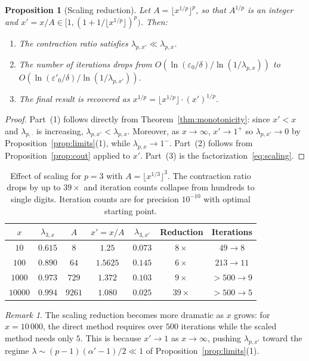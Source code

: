 \documentclass[10pt,a4paper,oneside]{book}
\newtheorem{proposition}[theorem]{Proposition}
\theoremstyle{definition}
\theoremstyle{remark}
\newtheorem{remark}[theorem]{Remark}
\newcommand{\eps}{\varepsilon}
\begin{document}
\begin{proposition}[Scaling reduction]
\label{prop:scaling}
Let $A = \lfloor x^{1/p} \rfloor^p$, so that $A^{1/p}$ is an integer and $x' = x/A \in [1, (1+1/\lfloor x^{1/p}\rfloor)^p)$. Then:
\begin{enumerate}
  \item The contraction ratio satisfies $\lambda_{p,x'} \ll \lambda_{p,x}$.
  \item The number of iterations drops from $O(\ln(\eps_0/\delta) / \ln(1/\lambda_{p,x}))$ to $O(\ln(\eps'_0/\delta) / \ln(1/\lambda_{p,x'}))$.
  \item The final result is recovered as $x^{1/p} = \lfloor x^{1/p} \rfloor \cdot (x')^{1/p}$.
\end{enumerate}
\end{proposition}

\begin{proof}
Part~(1) follows directly from Theorem~\ref{thm:monotonicity}: since $x' < x$ and $\lambda_{p,\cdot}$ is increasing, $\lambda_{p,x'} < \lambda_{p,x}$. Moreover, as $x \to \infty$, $x' \to 1^+$ so $\lambda_{p,x'} \to 0$ by Proposition~\ref{prop:limits}(1), while $\lambda_{p,x} \to 1^-$. Part~(2) follows from Proposition~\ref{prop:cout} applied to $x'$. Part~(3) is the factorization~\eqref{eq:scaling}.
\end{proof}

\begin{table}[h]
\centering
\begin{tabular}{ccccccc}
\toprule
$x$ & $\lambda_{3,x}$ & $A$ & $x' = x/A$ & $\lambda_{3,x'}$ & Reduction & Iterations \\
\midrule
$10$ & $0.615$ & $8$ & $1.25$ & $0.073$ & $8\times$ & $49 \to 8$ \\
$100$ & $0.890$ & $64$ & $1.5625$ & $0.145$ & $6\times$ & $213 \to 11$\\
$1000$ & $0.973$ & $729$ & $1.372$ & $0.103$ & $9\times$ & $>500 \to 9$ \\
$10000$ & $0.994$ & $9261$ & $1.080$ & $0.025$ & $39\times$ & $>500 \to 5$ \\
\bottomrule
\end{tabular}
\caption{Effect of scaling for $p = 3$ with $A = \lfloor x^{1/3} \rfloor^3$. The contraction ratio drops by up to $39\times$ and iteration counts collapse from hundreds to single digits. Iteration counts are for precision $10^{-10}$ with optimal starting point.}
\end{table}

\begin{remark}
The scaling reduction becomes more dramatic as $x$ grows: for $x = 10\,000$, the direct method requires over $500$ iterations while the scaled method needs only $5$. This is because $x' \to 1$ as $x \to \infty$, pushing $\lambda_{p,x'}$ toward the regime $\lambda \sim (p-1)(\alpha'-1)/2 \ll 1$ of Proposition~\ref{prop:limits}(1).
\end{remark}
\end{document}

